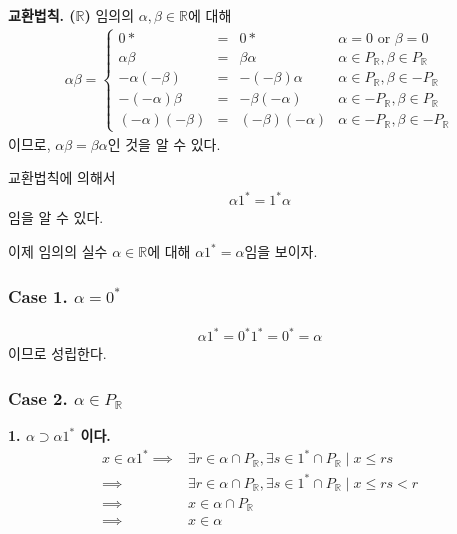 \documentclass{article}
\begin{document}
\textbf{교환법칙. ($\mathbb{R}$)} 임의의 $\alpha, \beta \in \mathbb{R}$에 대해
\begin{align*}
\alpha \beta = 
\left\{\begin{matrix}
0* &=& 0* & \text{$\alpha = 0 \text{ or } \beta = 0$}
\\ \alpha \beta &=&\beta \alpha & \text{$\alpha \in P_{\mathbb{R}}, \beta \in P_{\mathbb{R}}$}
\\ -\alpha (-\beta) &=& -(-\beta) \alpha & \text{$\alpha \in P_{\mathbb{R}}, \beta \in -P_{\mathbb{R}}$}
\\ -(-\alpha) \beta &=& -\beta (-\alpha) & \text{$\alpha \in -P_{\mathbb{R}}, \beta \in P_{\mathbb{R}}$}
\\ (-\alpha) (-\beta) &=& (-\beta) (-\alpha) & \text{$\alpha \in -P_{\mathbb{R}}, \beta \in -P_{\mathbb{R}}$}
\end{matrix}\right.
\end{align*}이므로, $\alpha \beta = \beta \alpha$인 것을 알 수 있다.

교환법칙에 의해서 
\begin{align*}
\alpha 1^* = 1^* \alpha \tag{1}
\end{align*}임을 알 수 있다. 

이제 임의의 실수 $\alpha \in \mathbb{R}$에 대해 $\alpha 1^* = \alpha$임을 보이자.

\subsubsection{Case 1. $\alpha = 0^*$}
\begin{align*}
\alpha 1^* = 0^* 1^* = 0^* = \alpha
\end{align*}이므로 성립한다.

\subsubsection{Case 2. $\alpha \in P_{\mathbb{R}}$}
\textbf{1. $\alpha \supset \alpha 1^*$ 이다.}
\begin{align*}
x \in \alpha 1^* \implies& \exists r \in \alpha \cap P_{\mathbb{R}}, \exists s \in 1^* \cap P_{\mathbb{R}} \mid x \le rs
\\ \implies& \exists r \in \alpha \cap P_{\mathbb{R}}, \exists s \in 1^* \cap P_{\mathbb{R}} \mid  x \le rs < r
\\ \implies& x \in \alpha \cap P_{\mathbb{R}}
\\ \implies& x \in \alpha
\end{align*}
\end{document}
